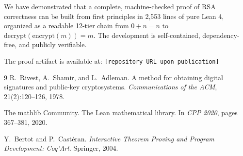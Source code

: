 \documentclass[11pt]{article}
\begin{document}
We have demonstrated that a complete, machine-checked proof of RSA correctness can be built from first principles in 2,553 lines of pure Lean 4, organized as a readable 12-tier chain from $0 + n = n$ to $\text{decrypt}(\text{encrypt}(m)) = m$. The development is self-contained, dependency-free, and publicly verifiable.

The proof artifact is available at: \texttt{[repository URL upon publication]}

\begin{thebibliography}{9}
R.~Rivest, A.~Shamir, and L.~Adleman.
\newblock A method for obtaining digital signatures and public-key cryptosystems.
\newblock \textit{Communications of the ACM}, 21(2):120--126, 1978.

The mathlib Community.
\newblock The {L}ean mathematical library.
\newblock In \textit{CPP 2020}, pages 367--381, 2020.

Y.~Bertot and P.~Cast\'{e}ran.
\newblock \textit{Interactive Theorem Proving and Program Development: Coq'Art}.
\newblock Springer, 2004.
\end{thebibliography}
\end{document}

